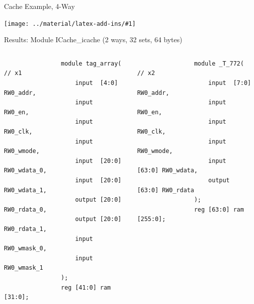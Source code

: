 \documentclass[]{beamer} %
\newcommand*{\COMPILEIMAGES}{}%
\newcommand\inputimage[1]{%
	\ifdefined\COMPILEIMAGES
		
	\else
		\texttt{[image: ../material/latex-add-ins/\#1]}
	\fi
	}
\newenvironment{fullpage}[0]{%
	\begin{list}{}{%
		\setlength{\leftmargin}{-7mm}%
		\setlength{\rightmargin}{-7mm}%
		\vspace*{-10pt}
		}%
\item[]}{\end{list}}
\begin{document}
\begin{frame}{Cache Example, 4-Way}
	\begin{fullpage}
		\fourwaytrue
		\inputimage{image1}
	\end{fullpage}
\end{frame}

\begin{frame}[fragile,t]{Results: Module ICache\_icache (2 ways, 32 sets, 64 bytes)}
	\begin{fullpage}
	\begin{columns}
		\begin{minipage}[t][\textheight][l]{\linewidth}
			\begin{verbatim}
				module tag_array( // x1
					input  [4:0] RW0_addr,
					input   RW0_en,
					input   RW0_clk,
					input   RW0_wmode,
					input  [20:0] RW0_wdata_0,
					input  [20:0] RW0_wdata_1,
					output [20:0] RW0_rdata_0,
					output [20:0] RW0_rdata_1,
					input   RW0_wmask_0,
					input   RW0_wmask_1
				);
				reg [41:0] ram [31:0];
			\end{verbatim}
		\end{minipage}
		\begin{minipage}[t][\textheight][l]{\linewidth}
			\begin{verbatim}
				module _T_772( // x2
					input  [7:0] RW0_addr,
					input   RW0_en,
					input   RW0_clk,
					input   RW0_wmode,
					input  [63:0] RW0_wdata,
					output [63:0] RW0_rdata
				);
				reg [63:0] ram [255:0];
			\end{verbatim}
		\end{minipage}
	\end{columns}
	\end{fullpage}
\end{frame}
\end{document}
